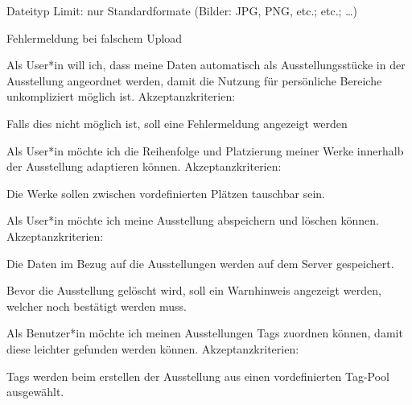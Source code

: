\begin{compactenum}
\begin{compactitem}
        \item Dateityp Limit: nur Standardformate (Bilder: JPG, PNG, etc.; etc.; …)
        \item Fehlermeldung bei falschem Upload
    \end{compactitem}
    \item  Als User*in will ich, dass meine Daten automatisch als Ausstellungsstücke in der Ausstellung angeordnet werden, damit die Nutzung für persönliche Bereiche unkompliziert möglich ist. Akzeptanzkriterien:
    \begin{compactitem}
        \item Falls dies nicht möglich ist, soll eine Fehlermeldung angezeigt werden
    \end{compactitem}
    \item Als User*in möchte ich die Reihenfolge und Platzierung meiner Werke innerhalb der Ausstellung adaptieren können. Akzeptanzkriterien:
    \begin{compactitem}
        \item Die Werke sollen zwischen vordefinierten Plätzen tauschbar sein.
    \end{compactitem}
    \item Als User*in möchte ich meine Ausstellung abspeichern und löschen können. Akzeptanzkriterien:
    \begin{compactitem}
        \item Die Daten im Bezug auf die Ausstellungen werden auf dem Server gespeichert.
        \item Bevor die Ausstellung gelöscht wird, soll ein Warnhinweis angezeigt werden, welcher noch bestätigt werden muss.
    \end{compactitem}
    \item Als Benutzer*in möchte ich meinen Ausstellungen Tags zuordnen können, damit diese leichter gefunden werden können. Akzeptanzkriterien:
    \begin{compactitem}
        \item Tags werden beim erstellen der Ausstellung aus einen vordefinierten Tag-Pool ausgewählt.
    \end{compactitem}
\end{compactenum}


